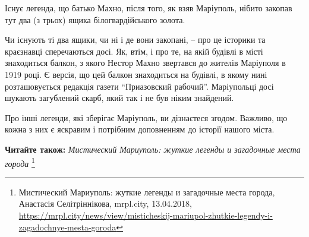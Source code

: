 Існує легенда, що батько Махно, після того, як взяв Маріуполь, нібито закопав
тут два (з трьох) ящика білогвардійського золота.

Чи існують ті два ящики, чи ні і де вони закопані, – про це історики та
краєзнавці сперечаються досі. Як, втім, і про те, на якій будівлі в місті
знаходиться балкон, з якого Нестор Махно звертався до жителів Маріуполя в 1919
році. Є версія, що цей балкон знаходиться на будівлі, в якому нині
розташовується редакція газети \enquote{Приазовский рабочий}. Маріупольці досі
шукають загублений скарб, який так і не був ніким знайдений.

Про інші легенди, які зберігає Маріуполь, ви дізнаєтеся згодом. Важливо, що
кожна з них є яскравим і потрібним доповненням до історії нашого міста.

\textbf{Читайте також:} \emph{Мистический Мариуполь: жуткие легенды и загадочные места города}%
\footnote{Мистический Мариуполь: жуткие легенды и загадочные места города, Анастасія Селітріннікова, mrpl.city, 13.04.2018, \url{https://mrpl.city/news/view/misticheskij-mariupol-zhutkie-legendy-i-zagadochnye-mesta-goroda}}

